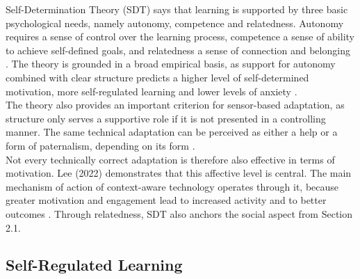 \documentclass[runningheads]{llncs}
\begin{document}
Self-Determination Theory (SDT) says that learning is supported by three basic psychological needs, namely autonomy, competence and relatedness. Autonomy requires a sense of control over the learning process, competence a sense of ability to achieve self-defined goals, and relatedness a sense of connection and belonging \cite{ryan_intrinsic_2020}.
The theory is grounded in a broad empirical basis, as support for autonomy combined with clear structure predicts a higher level of self-determined motivation, more self-regulated learning and lower levels of anxiety \cite{ryan_intrinsic_2020}.\\
The theory also provides an important criterion for sensor-based adaptation, as structure only serves a supportive role if it is not presented in a controlling manner. The same technical adaptation can be perceived as either a help or a form of paternalism, depending on its form \cite{ryan_intrinsic_2020}.\\
Not every technically correct adaptation is therefore also effective in terms of motivation. Lee (2022) demonstrates that this affective level is central. The main mechanism of action of context-aware technology operates through it, because greater motivation and engagement lead to increased activity and to better outcomes \cite{lee_systematic_2022}. Through relatedness, SDT also anchors the social aspect from Section 2.1.


\subsection{Self-Regulated Learning}
\end{document}
